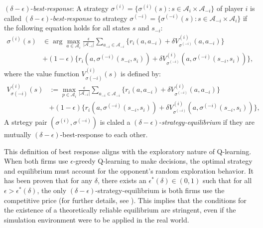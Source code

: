 \documentclass[mnsc,nonblindrev]{workingpaper}
\begin{document}
\begin{definition}
    $(\delta-\epsilon)$-\textit{best-response}: A strategy $\sigma^{(i)}=\{\sigma^{(i)}(s):s\in\mathcal{A}_i\times\mathcal{A}_{-i}\}$ of player $i$ is called $(\delta-\epsilon)$-\textit{best-response} to strategy $\sigma^{(-i)}=\{\sigma^{(-i)}(s):s\in\mathcal{A}_{-i}\times\mathcal{A}_{i}\}$ if the following equation holds for all states $s$ and $s_{-i}$:
    \begin{equation}
        \begin{aligned}
            \sigma^{(i)}(s)&\in\arg\max_{a\in\mathcal{A}_{i}}\frac{\epsilon}{|\mathcal{A}_{-i}|}\sum_{a_{-i}\in\mathcal{A}_{-i}}\{r_{i}(a,a_{-i})+\delta V_{\sigma^{(-i)}}^{(i)}(a,a_{-i})\}\\
            &+(1-\epsilon)\{r_{i}(a,\sigma^{(-i)}(s_{-i},s_{i}))+\delta V_{\sigma^{(-i)}}^{(i)}(a,\sigma^{(-i)}(s_{-i},s_{i}))\},
        \end{aligned}
    \end{equation}
    where the value function $V_{\sigma(-i)}^{(i)}(s)$ is defined by:
    \begin{equation}
        \begin{aligned}
            V_{\sigma(-i)}^{(i)}(s)&:=\max_{p\in\mathcal{A}_{i}}\frac{\epsilon}{|\mathcal{A}_{-i}|}\sum_{a_{-i}\in\mathcal{A}_{-i}}\{r_{i}(a,a_{-i})+\delta V_{\sigma^{(-i)}}^{(i)}(a,a_{-i})\}\\
            &+(1-\epsilon)\{r_{i}(a,\sigma^{(-i)}(s_{-i},s_{i}))+\delta V_{\sigma^{(-i)}}^{(i)}(a,\sigma^{(-i)}(s_{-i},s_{i}))\},
        \end{aligned}
    \end{equation}
    A strtegy pair $(\sigma^{(i)},\sigma^{(-i)})$ is claled a $(\delta-\epsilon)$-\textit{strategy-equilibrium} if they are mutually $(\delta-\epsilon)$-best-response to each other.
\end{definition}

This definition of best response aligns with the exploratory nature of Q-learning. When both firms use $\epsilon$-greedy Q-learning to make decisions, the optimal strategy and equilibrium must account for the opponent's random exploration behavior. It has been proven that for any $\delta$, there exists an $\epsilon^*(\delta)\in (0,1)$ such that for all $\epsilon>\epsilon^*(\delta)$, the only $(\delta-\epsilon)$-strategy-equilibrium is both firms use the competitive price (for further details, see \cite{den2022artificial}). This implies that the conditions for the existence of a theoretically reliable equilibrium are stringent, even if the simulation environment were to be applied in the real world.
\end{document}
